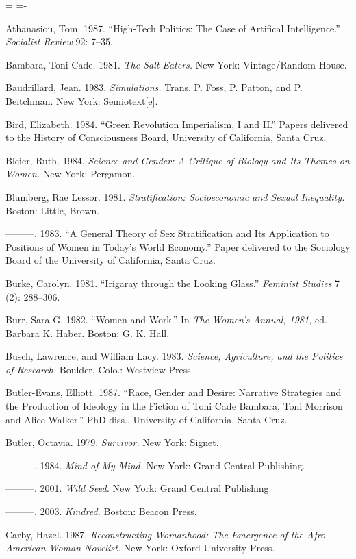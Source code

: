 \documentclass[DIV=12,%
               BCOR=10mm,%
               headinclude=false,%
               footinclude=false,open=any,%
               fontsize=11pt,%
               twoside,%
               paper=210mm:11in]%
               {scrbook}
\newenvironment*{amusebiblio}{
  \leftskip=\parindent
  \parindent=-\parindent
  \smallskip
  \indent
}{\smallskip}
\newcommand*{\Slash}{\slash\hspace{0pt}}
\begin{document}
\begin{amusebiblio}


Athanasiou, Tom. 1987. “High-Tech Politics: The Case of Artifical Intelligence.” \emph{Socialist Review} 92: 7–35.


Bambara, Toni Cade. 1981. \emph{The Salt Eaters.} New York: Vintage\Slash{}Random House.


Baudrillard, Jean. 1983. \emph{Simulations.} Trans. P. Foss, P. Patton, and P. Beitchman. New York: Semiotext[e].


Bird, Elizabeth. 1984. “Green Revolution Imperialism, I and II.” Papers delivered to the History of Consciousness Board, University of California, Santa Cruz.


Bleier, Ruth. 1984. \emph{Science and Gender: A Critique of Biology and Its Themes on Women.} New York: Pergamon.


Blumberg, Rae Lessor. 1981. \emph{Stratification: Socioeconomic and Sexual Inequality.} Boston: Little, Brown.


———. 1983. “A General Theory of Sex Stratification and Its Application to Positions of Women in Today’s World Economy.” Paper delivered to the Sociology Board of the University of California, Santa Cruz.


Burke, Carolyn. 1981. “Irigaray through the Looking Glass.” \emph{Feminist Studies} 7 (2): 288–306.


Burr, Sara G. 1982. “Women and Work.” In \emph{The Women’s Annual, 1981,} ed. Barbara K. Haber. Boston: G. K. Hall.


Busch, Lawrence, and William Lacy. 1983. \emph{Science, Agriculture, and the Politics of Research.} Boulder, Colo.: Westview Press.


Butler-Evans, Elliott. 1987. “Race, Gender and Desire: Narrative Strategies and the Production of Ideology in the Fiction of Toni Cade Bambara, Toni Morrison and Alice Walker.” PhD diss., University of California, Santa Cruz.


Butler, Octavia. 1979. \emph{Survivor.} New York: Signet.


———. 1984. \emph{Mind of My Mind.} New York: Grand Central Publishing.


———. 2001. \emph{Wild Seed.} New York: Grand Central Publishing.


———. 2003. \emph{Kindred.} Boston: Beacon Press.


Carby, Hazel. 1987. \emph{Reconstructing Womanhood: The Emergence of the Afro-American Woman Novelist.} New York: Oxford University Press.



\end{amusebiblio}
\end{document}
